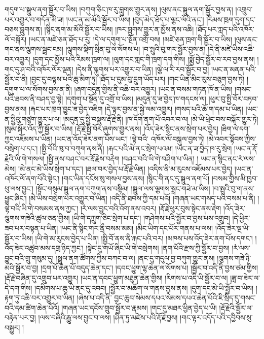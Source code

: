 གདུག་པ་སྦྲུལ་ནག་སྦྱོར་བ་ཡིས། །བཀུག་ཅིང་ཁ་རུ་བླུགས་གྱུར་ནས། །ལུས་ནང་སྦྲུལ་ནག་སྦྱོར་བྱས་ན། །འགྲུབ་པར་འགྱུར་བ་གདོན་མི་ཟ། །ཡང་ན་མ་མོའི་སྦྱོར་བ་ཡིས། །བུད་མེད་ཐོད་པ་ལྕང་ལོའི་ནང་། །རིམས་ཁྲག་དུག་དང་བཅས་བླུགས་ན། །སྙིང་ནག་མ་མོའི་སྦྱོར་བ་ཡིས། །ཁར་བླུགས་གྱུར་ན་མྱོས་ནས་འཆི། །ཐོད་པར་ཀླད་པའི་འཁོར་ལོ་བསྐོར། །ཡང་ན་མཛེ་ཅན་ཐོད་པ་རུ། །དེ་ལ་དགུག་པ་སྔོན་འགྲོ་བས། །མཛེ་ཅན་ཁྲག་གི་སྦྱོར་བ་ཡིས། །ལུས་ནང་གང་ནས་ལྕགས་སྦྲང་ངམ། །ལྕགས་སྡིག་སྲིན་བུ་ལ་སོགས་པ། །བ་སྤུའི་བུ་གར་སྦྱོར་བྱས་ན། །དེ་ནི་མཛེ་ཡིས་འཆི་བར་འགྱུར། །དུག་དང་མྱོས་པའི་རིམས་ཁྲག་ལ། །ལུག་དང་གླང་གི་ཁྲག་དག་གིས། །སྨྱོ་བྱེད་སྦྱོར་བ་རབ་བྱས་ནས། །གང་དུ་ཤ་བའི་འཁོར་ལོར་ལྡན། །དེས་ནི་ལྐུགས་པར་འགྱུར་བ་ཡིན། །ལྕེ་ལ་རི་རབ་སྦྱོར་བ་བྱ། །ཡང་ན་མནན་པའི་སྦྱོར་བ་ནི། །བྱང་དུ་བལྟས་པའི་ཆུ་མིག་ཏུ། །ཐོད་པ་དུམ་བུ་དྲུག་ཡོད་པར། །གང་ཡིན་མིང་རུས་བཅུག་བྱས་ཏེ། །དགུག་པ་ལ་སོགས་བྱས་ན་ནི། །ཞག་བདུན་གྱིས་ནི་འཆི་བར་འགྱུར། །ཡང་ན་བསམ་གཏན་ཁོ་ན་ཡིས། །གསང་པའི་ཐབས་ནི་བཤད་བྱ་སྟེ། །དགུག་པ་སྔོན་དུ་འགྲོ་བ་ཡིས། །མདུན་དུ་ཟ་བྱེད་ཁ་གདངས་ལ། །ཕུར་བུ་སྤྱི་བོར་བཏབ་བྱས་ནས། །རྐང་པར་ཁྲག་བྱུང་ཟ་བྱེད་འཇིག །དེ་ལྟར་བྱས་ན་སྐྱེ་ལམ་འགྱུར། །གསད་པའི་ཆོ་ག་དམ་པ་ཡིན། །ཡང་ན་སྤྱིའུ་གཙུག་གྱུར་པ་ལ། །མདུན་དུ་སྤྱི་བསྡུས་རྡོ་རྗེ་ནི། །ཁ་དོག་ནག་པོ་འབར་བ་ལ། །མེ་ཡི་ཕྲེང་བས་བསྐོར་གྱུར་ཏེ། །སུམ་སྐོར་འོད་ཀྱི་སྦྱོར་བ་ཡིས། །རྡོ་རྗེ་སྤྱི་བོར་ཞུགས་གྱུར་ནས། །འོད་ཟེར་སྙིང་ནས་སྲེག་པར་བྱེད། །ཐིག་ལེ་དག་ཀྱང་འཇོམས་པ་ཡིན། །ཡང་ན་འོད་ཟེར་ནག་པོས་ཡང་། །ལྟེ་བའི་​ འཁོར་ལོ་བསྐུལ་བྱས་ཏེ། །མེ་འབར་སྟོབས་ཀྱིས་བསྲེག་པ་དང་། །སྤྱི་བོའི་ཁུ་བ་བཀུག་ནས་ནི། །རྐང་པའི་མེ་ནང་སྲེག་པའམ། །ཡང་ན་ཟ་བྱེད་ཁ་རུ་སྲེག །ཡང་ན་རྡོ་རྗེའི་ཡི་གེ་གསལ། །སྤྱི་ནས་བཤང་བར་རྡོ་རྗེས་བརྡེག །བཤང་བའི་ཡི་གེ་བཤིག་པ་ཡིན། །
ཡང་ན་སྙིང་ནང་རཾ་ལས་མེས། །མེ་ནང་མེ་ཡིས་སྲེག་པ་དང་། །ཐལ་བར་བྱེད་པ་རྡོ་རྗེ་ཡིན། །འདིས་ནི་མ་རུངས་འཇོམས་པར་བྱེད། །ཡང་ན་འཁོར་ལོ་ནག་པོའི་སྟེང་། །གང་ཡིན་དངོས་སུ་གསལ་བྱས་ནས། །སྙིང་གི་ནང་དུ་སྦྲུལ་ནག་པོ། །བསམ་གྱིས་མི་ཁྱབ་ཕུ་ལས་བྱུང་། །སྟོང་གསུམ་སྦྲུལ་ནག་བཀུག་ནས་བསྟིམ། །སྦྲུལ་ལས་ལྕགས་སྦྲང་གཟེ་མ་ཡིས། །བ་སྤུའི་བུ་ག་ནས་ཕྱུང་ཞིང་། །མེ་ཡིས་བསྲེག་པར་འགྱུར་བ་ཡིན། །འདི་ནི་ཐབས་ཀྱི་དམ་པའོ། །གཞན་ཡང་གསད་པའི་བསམ་པ་ནི། །ལྟེ་བའི་ཡི་གེ་བསམས་ནས་ཀྱང་། །རཾ་ལས་བྱུང་བའི་འོག་ནས་འབར། །རྡོ་རྗེ་ཕུར་བུས་སྟེང་ནས་རྡེག །འོད་ཟེར་ལྕགས་གཟེའི་ཚུལ་ཅན་གྱིས། །ཡི་གེ་དཀྲུག་ཅིང་སྲེག་པ་དང་། །གཤེགས་པའི་སྦྱོར་བ་བྱས་པས་འགྲུབ། །དེ་ཕྱིར་ཟབ་པར་བསྟན་པ་ཡིན། །ཡང་ནི་སྙིང་གར་ནྲྀ་བསམ་མམ། །མིང་ཡིག་དང་པོར་གནས་པ་ལས། །འོད་ཟེར་ལྔ་ཡི་སྦྱོར་བ་ཡིས། །ཡི་གེ་མ་རུངས་བྱེད་པ་ཡིན། །སྤྱི་བོ་ནས་ནི་རྐང་པའི་བར། །མཁས་པས་འོད་ཟེར་ནག་པོས་དགང་། །འོད་ཟེར་འཚུབ་མས་དགྲ་ཉིད་ཀྱང་། །སྟེང་དུ་གཡོ་ཞིང་ཡི་གེ་བསྲེགས། །ནག་པོའི་རྫས་ཀྱི་སྦྱོར་བ་བྱས། །རཾ་ལས་བྱུང་བའི་གྲུ་གསུམ་དུ། །སྦྲུལ་ནག་ཚོགས་ཀྱིས་བཀང་བ་ལ། །ནང་དུ་གདུལ་བྱ་བཀུག་གྱུར་ནས། །ལྕགས་གཟེ་ཉི་མའི་སྦྱོར་བ་བྱ། །དྲག་པོ་ཆེན་པོ་བདུད་ཆེན་དང་། །དབང་ཕྱུག་ལྷ་ཆེན་ལ་སོགས་པ། །སྦྱོར་བ་འདི་ནི་བྱས་ཙམ་གྱིས། །རྡོ་རྗེ་བཞིན་དུ་འགྲུབ་པར་འགྱུར། །ཡང་ན་དབང་ཕྱུག་མཐུན་ཆེན་གྱིས། །རིགས་པ་འདི་ཡི་སྦྱོར་བ་ལ། །ཟླ་བ་ཟེར་ལ་དེ་དག་གིས། །དམིགས་པ་ཆུ་ཡི་ནང་དུ་འབབ། །སྦྱོར་བ་མཆོག་ལ་གནས་བྱས་ནས། །དུག་དང་མེ་ཡི་སྦྱོར་བ་ཡིས། །རྟག་ཏུ་འཆི་བར་འགྱུར་བ་ཡིན། །ཞེས་པ་འདི་ནི་​ བྱང་ཆུབ་སེམས་དཔའ་སེམས་དཔའ་ཆེན་པོའི་ཇི་སྲིད་དུ་གསང་བའི་དམ་ཚིག་ཆེན་པོའོ། །གཞན་ཡང་དངོས་གྲུབ་སྦྱོར་བ་རྣམས། །གང་དུ་མཐར་ཕྱིན་བྱེད་པ་ཡི། །རྡོ་རྗེའི་སྦྱོར་ལ་བརྟེན་པར་བྱ། །ལས་བཞིའི་རྒྱུ་ལས་བྱུང་བ་ལས། །ཤིན་ཏུ་མཛེས་པའི་རྡོ་རྗེ་བྱས། །གང་ལྟར་འདོད་པའི་དབྱིབས་སུ་བསྒྱུར། །
